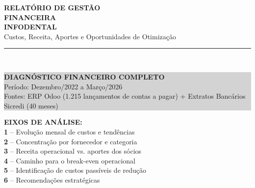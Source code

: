 \documentclass[12pt, a4paper]{article}
\begin{document}
\begin{titlepage}
    \centering
    \vspace*{3cm}
    {\Huge \textbf{\textcolor{primaryColor}{RELATÓRIO DE GESTÃO}}} \\
    \vspace{0.3cm}
    {\Huge \textbf{\textcolor{primaryColor}{FINANCEIRA}}} \\
    \vspace{0.5cm}
    {\Large \textbf{INFODENTAL}} \\
    \vspace{0.3cm}
    {\large Custos, Receita, Aportes e Oportunidades de Otimização} \\
    \vspace{2cm}
    \rule{10cm}{1.5pt} \\
    \vspace{0.5cm}
    \colorbox{lightGray}{%
        \parbox{0.9\textwidth}{%
            \centering
            \vspace{0.3cm}
            {\Large \textbf{DIAGNÓSTICO FINANCEIRO COMPLETO}} \\
            \vspace{0.3cm}
            {\large Período: Dezembro/2022 a Março/2026} \\
            \vspace{0.1cm}
            {\normalsize Fontes: ERP Odoo (1.215 lançamentos de contas a pagar) + Extratos Bancários Sicredi (40 meses)} \\
            \vspace{0.3cm}
        }%
    }
    \vspace{2cm}

    \begin{flushleft}
    \textbf{EIXOS DE ANÁLISE:} \\
    \vspace{0.2cm}
    \textcolor{primaryColor}{\textbf{1}} -- Evolução mensal de custos e tendências \\
    \textcolor{primaryColor}{\textbf{2}} -- Concentração por fornecedor e categoria \\
    \textcolor{primaryColor}{\textbf{3}} -- Receita operacional vs. aportes dos sócios \\
    \textcolor{primaryColor}{\textbf{4}} -- Caminho para o break-even operacional \\
    \textcolor{primaryColor}{\textbf{5}} -- Identificação de custos passíveis de redução \\
    \textcolor{primaryColor}{\textbf{6}} -- Recomendações estratégicas
    \end{flushleft}


\end{titlepage}
\end{document}
